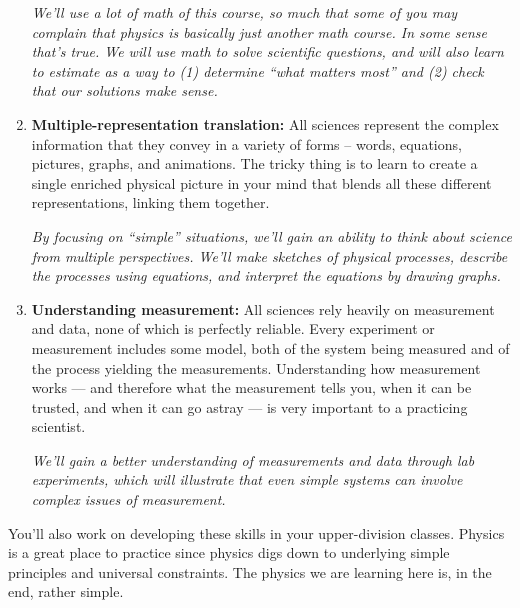 \begin{enumerate}
{\it We'll use a lot of math of this course, so much that some of you may complain that physics is basically just another math course. In some sense that's true. We will use math to solve scientific questions, and will also learn to estimate as a way to (1) determine ``what matters most'' and (2) check that our solutions make sense.}

\item {\bf Multiple-representation translation:} 
  All sciences represent the complex information that they convey in a variety of forms -- words, equations, pictures, graphs, and animations. The tricky thing is to learn to create a single enriched physical picture in your mind that blends all these different representations, linking them together.

{\it By focusing on ``simple'' situations, we'll gain an ability to think about science from multiple perspectives. We'll make sketches of physical processes, describe the processes using equations, and interpret the equations by drawing graphs.}

\item {\bf Understanding measurement:}
  All sciences rely heavily on measurement and data, none of which is perfectly reliable. Every experiment or measurement includes some model, both of the system being measured and of the process yielding the measurements. Understanding how measurement works --- and therefore what the measurement tells you, when it can be trusted, and when it can go astray --- is very important to a practicing scientist.

  {\it We'll gain a better understanding of measurements and data through lab experiments, which will illustrate that even simple systems can involve complex issues of measurement.}
  
\end{enumerate} 

You'll also work on developing these skills in your upper-division classes. Physics is a great place to practice since physics digs down to underlying simple principles and universal constraints. The physics we are learning here is, in the end, rather simple.




\clearpage
